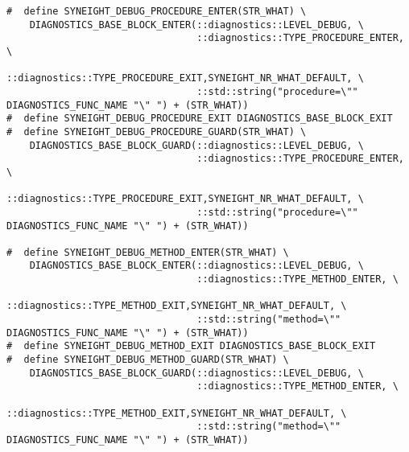 \begin{verbatim}
#  define SYNEIGHT_DEBUG_PROCEDURE_ENTER(STR_WHAT) \
    DIAGNOSTICS_BASE_BLOCK_ENTER(::diagnostics::LEVEL_DEBUG, \
                                 ::diagnostics::TYPE_PROCEDURE_ENTER, \
                                 ::diagnostics::TYPE_PROCEDURE_EXIT,SYNEIGHT_NR_WHAT_DEFAULT, \
                                 ::std::string("procedure=\"" DIAGNOSTICS_FUNC_NAME "\" ") + (STR_WHAT))
#  define SYNEIGHT_DEBUG_PROCEDURE_EXIT DIAGNOSTICS_BASE_BLOCK_EXIT
#  define SYNEIGHT_DEBUG_PROCEDURE_GUARD(STR_WHAT) \
    DIAGNOSTICS_BASE_BLOCK_GUARD(::diagnostics::LEVEL_DEBUG, \
                                 ::diagnostics::TYPE_PROCEDURE_ENTER, \
                                 ::diagnostics::TYPE_PROCEDURE_EXIT,SYNEIGHT_NR_WHAT_DEFAULT, \
                                 ::std::string("procedure=\"" DIAGNOSTICS_FUNC_NAME "\" ") + (STR_WHAT))

#  define SYNEIGHT_DEBUG_METHOD_ENTER(STR_WHAT) \
    DIAGNOSTICS_BASE_BLOCK_ENTER(::diagnostics::LEVEL_DEBUG, \
                                 ::diagnostics::TYPE_METHOD_ENTER, \
                                 ::diagnostics::TYPE_METHOD_EXIT,SYNEIGHT_NR_WHAT_DEFAULT, \
                                 ::std::string("method=\"" DIAGNOSTICS_FUNC_NAME "\" ") + (STR_WHAT))
#  define SYNEIGHT_DEBUG_METHOD_EXIT DIAGNOSTICS_BASE_BLOCK_EXIT
#  define SYNEIGHT_DEBUG_METHOD_GUARD(STR_WHAT) \
    DIAGNOSTICS_BASE_BLOCK_GUARD(::diagnostics::LEVEL_DEBUG, \
                                 ::diagnostics::TYPE_METHOD_ENTER, \
                                 ::diagnostics::TYPE_METHOD_EXIT,SYNEIGHT_NR_WHAT_DEFAULT, \
                                 ::std::string("method=\"" DIAGNOSTICS_FUNC_NAME "\" ") + (STR_WHAT))


\end{verbatim}
